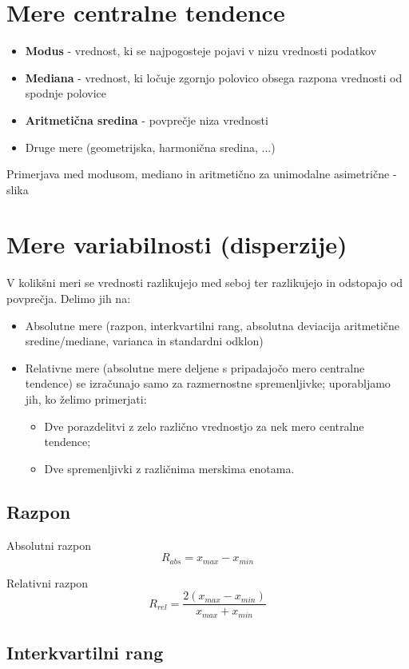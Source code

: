 \section{Mere centralne tendence}
\begin{itemize}
    \item \textbf{Modus} - vrednost, ki se najpogosteje pojavi v nizu vrednosti podatkov
    \item \textbf{Mediana} - vrednost, ki ločuje zgornjo polovico obsega razpona vrednosti od spodnje polovice
    \item \textbf{Aritmetična sredina} - povprečje niza vrednosti
    \item Druge mere (geometrijska, harmonična sredina, ...)
\end{itemize}
Primerjava med modusom, mediano in aritmetično za unimodalne asimetrične - slika

\section{Mere variabilnosti (disperzije)}
V kolikšni meri se vrednosti razlikujejo med seboj ter razlikujejo in odstopajo od povprečja. Delimo jih na:
\begin{itemize}
    \item Absolutne mere (razpon, interkvartilni rang, absolutna deviacija aritmetične sredine/mediane, varianca in standardni odklon) 
    \item Relativne mere (absolutne mere deljene s pripadajočo mero centralne tendence) se izračunajo samo za razmernostne spremenljivke; uporabljamo jih, ko želimo primerjati:
    \begin{itemize}
        \item Dve porazdelitvi z zelo različno vrednostjo za nek mero centralne tendence;
        \item Dve spremenljivki z različnima merskima enotama.
    \end{itemize}
\end{itemize}

\subsection*{Razpon}

Absolutni razpon \[R_{abs}=x_{max}-x_{min}\]

Relativni razpon \[R_{rel}=\frac{2\left(x_{max}-x_{min}\right)}{x_{max}+x_{min}}\]

\subsection*{Interkvartilni rang}

